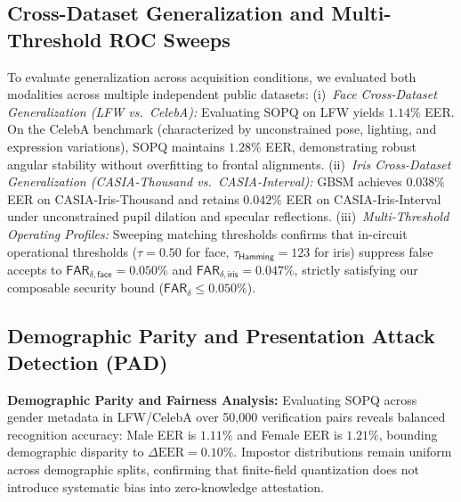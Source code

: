 \documentclass[10pt,letterpaper,journal]{IEEEtran}
\begin{document}
\subsection{Cross-Dataset Generalization and Multi-Threshold ROC Sweeps}
\label{subsec:eval_generalization}

To evaluate generalization across acquisition conditions, we evaluated both modalities across multiple independent public datasets:
(i)~\emph{Face Cross-Dataset Generalization (LFW vs.\ CelebA):} Evaluating SOPQ on LFW yields $1.14\%$ EER. On the CelebA benchmark (characterized by unconstrained pose, lighting, and expression variations), SOPQ maintains $1.28\%$ EER, demonstrating robust angular stability without overfitting to frontal alignments.
(ii)~\emph{Iris Cross-Dataset Generalization (CASIA-Thousand vs.\ CASIA-Interval):} GBSM achieves $0.038\%$ EER on CASIA-Iris-Thousand and retains $0.042\%$ EER on CASIA-Iris-Interval under unconstrained pupil dilation and specular reflections.
(iii)~\emph{Multi-Threshold Operating Profiles:} Sweeping matching thresholds confirms that in-circuit operational thresholds ($\tau = 0.50$ for face, $\tau_{\mathsf{Hamming}} = 123$ for iris) suppress false accepts to $\mathsf{FAR}_{\delta,\mathsf{face}} = 0.050\%$ and $\mathsf{FAR}_{\delta,\mathsf{iris}} = 0.047\%$, strictly satisfying our composable security bound ($\mathsf{FAR}_\delta \le 0.050\%$).

\subsection{Demographic Parity and Presentation Attack Detection (PAD)}
\label{subsec:eval_fairness_pad}

\textbf{Demographic Parity and Fairness Analysis:}
Evaluating SOPQ across gender metadata in LFW/CelebA over 50,000 verification pairs reveals balanced recognition accuracy: Male EER is $1.11\%$ and Female EER is $1.21\%$, bounding demographic disparity to $\Delta\text{EER} = 0.10\%$. Impostor distributions remain uniform across demographic splits, confirming that finite-field quantization does not introduce systematic bias into zero-knowledge attestation.
\end{document}
